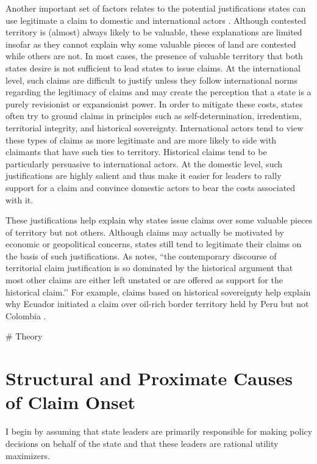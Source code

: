 Another important set of factors relates to the potential justifications states can use legitimate a claim to domestic and international actors \citep{burghardt1973, murphy1990, abramson2015}. Although contested territory is (almost) always likely to be valuable, these explanations are limited insofar as they cannot explain why some valuable pieces of land are contested while others are not. In most cases, the presence of valuable territory that both states desire is not sufficient to lead states to issue claims. At the international level, such claims are difficult to justify unless they follow international norms regarding the legitimacy of claims and may create the perception that a state is a purely revisionist or expansionist power. In order to mitigate these costs, states often try to ground claims in principles such as self-determination, irredentism, territorial integrity, and historical sovereignty. International actors tend to view these types of claims as more legitimate and are more likely to side with claimants that have such ties to territory. Historical claims tend to be particularly persuasive to international actors. At the domestic level, such justifications are highly salient and thus make it easier for leaders to rally support for a claim and convince domestic actors to bear the costs associated with it. 

These justifications help explain why states issue claims over some valuable pieces of territory but not others. Although claims may actually be motivated by economic or geopolitical concerns, states still tend to legitimate their claims on the basis of such justifications. As \cite[][p. 544]{murphy1990} notes, ``the contemporary discourse of territorial claim justification is so dominated by the historical argument that most other claims are either left unstated or are offered as support for the historical claim.’’ For example, claims based on historical sovereignty help explain why Ecuador initiated a claim over oil-rich border territory held by Peru but not Colombia \citep{murphy1990}. 



# Theory
\section{Structural and Proximate Causes of Claim Onset}
I begin by assuming that state leaders are primarily responsible for making policy decisions on behalf of the state and that these leaders are rational utility maximizers. 


